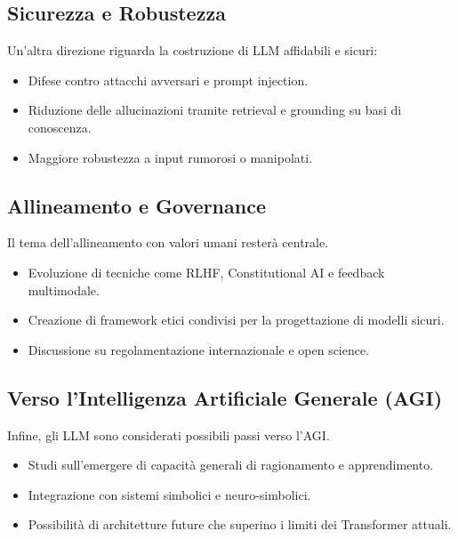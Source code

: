 \subsection{Sicurezza e Robustezza}
Un'altra direzione riguarda la costruzione di LLM affidabili e sicuri:
\begin{itemize}
    \item Difese contro attacchi avversari e prompt injection.
    \item Riduzione delle allucinazioni tramite retrieval e grounding su basi di conoscenza.
    \item Maggiore robustezza a input rumorosi o manipolati.
\end{itemize}

\subsection{Allineamento e Governance}
Il tema dell'allineamento con valori umani resterà centrale.
\begin{itemize}
    \item Evoluzione di tecniche come RLHF, Constitutional AI e feedback multimodale.
    \item Creazione di framework etici condivisi per la progettazione di modelli sicuri.
    \item Discussione su regolamentazione internazionale e open science.
\end{itemize}

\subsection{Verso l'Intelligenza Artificiale Generale (AGI)}
Infine, gli LLM sono considerati possibili passi verso l'AGI.
\begin{itemize}
    \item Studi sull'emergere di capacità generali di ragionamento e apprendimento.
    \item Integrazione con sistemi simbolici e neuro-simbolici.
    \item Possibilità di architetture future che superino i limiti dei Transformer attuali.
\end{itemize}